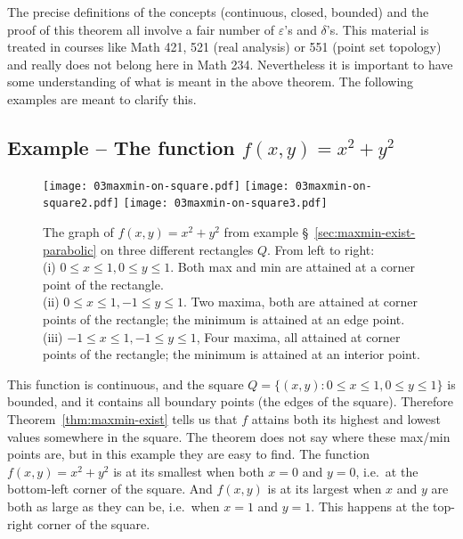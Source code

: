 The precise definitions of the concepts (continuous, closed, bounded) and the
proof of this theorem all involve a fair number of $\varepsilon$'s and
$\delta$'s.  This material is treated in courses like Math 421, 521 (real
analysis) or 551 (point set topology) and really does not belong here in Math
234.  Nevertheless it is important to have some understanding of what is meant
in the above theorem.  The following examples are meant to clarify this.


\subsection{Example -- The function $f(x, y) = x^2+y^2$}

\label{sec:examples-maxmin-existence}
\begin{figure}[tb]
  \centering
  \texttt{[image: 03maxmin-on-square.pdf]}
  \texttt{[image: 03maxmin-on-square2.pdf]}
  \texttt{[image: 03maxmin-on-square3.pdf]}
  \caption{The graph of $f(x, y) = x^2+y^2$ from example
    \S~\ref{sec:maxmin-exist-parabolic} on three different rectangles $Q$.
    From left to right:\\
    \null\quad(i) $0\leq x\leq1, 0\leq y\leq1$.
    Both max and min are attained at a corner point of the rectangle.\\
    \null\quad(ii) $0\leq x\leq1, -1\leq y\leq1$. Two maxima, both are attained
    at corner points of the rectangle;
    the minimum is attained at an edge point.\\
    \null\quad(iii) $-1\leq x\leq1, -1\leq y\leq1$, Four maxima, all attained at
    corner points of the rectangle; the minimum is attained at an interior
    point.}
  \label{fig:03maxmin-on-square}
\end{figure}


\label{sec:maxmin-exist-parabolic} 
This function is continuous, and the square $Q = \{(x, y) : 0\leq x\leq1, 0\leq
y\leq1\}$ is bounded, and it contains all boundary points (the edges of the
square).  Therefore Theorem~\ref{thm:maxmin-exist} tells us that $f$ attains
both its highest and lowest values somewhere in the square.  The theorem does
not say where these max/min points are, but in this example they are easy to
find.  The function $f(x, y) = x^2+y^2 $ is at its smallest when both $x=0$ and
$y=0$, i.e.\ at the bottom-left corner of the square.  And $f(x,y)$ is at its
largest when $x$ and $y$ are both as large as they can be, i.e.~when $x=1$ and
$y=1$.  This happens at the top-right corner of the square.

